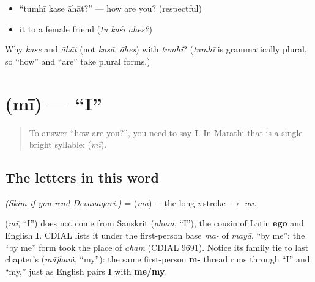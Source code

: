 \begin{itemize}
\raggedright
  \item \textquotedblleft{}tumhī kase āhāt?\textquotedblright{} — how are you? (respectful)
  \item it to a female friend (\emph{tū kaśī āhes?})
\end{itemize}

\begin{tcolorbox}[breakable,colback=teal!4,colframe=teal!35!black,title={Before you move on}]
Why \emph{kase} and \emph{āhāt} (not \emph{kasā}, \emph{āhes}) with \emph{tumhī}? (\emph{tumhī} is grammatically plural, so \textquotedblleft{}how\textquotedblright{} and \textquotedblleft{}are\textquotedblright{} take plural forms.)
\end{tcolorbox}
\section[\texorpdfstring{\mr{मी} (mī)}{मी (mī)}]{ (mī) — \textquotedblleft{}I\textquotedblright{}}

\label{lesson:MR-C03-mi}



\begin{quote}
To answer \textquotedblleft{}how are you?\textquotedblright{}, you need to say \textbf{I}. In Marathi that is a single bright syllable: \textbf{} (\emph{mī}).
\end{quote}

\subsection*{The letters in this word}
\emph{(Skim if you read Devanagari.)} \textbf{} = \textbf{} (\emph{ma}) + the long-\emph{ī} stroke \textbf{} $\to$ \emph{mī}.

\begin{cousinweb}
\textbf{} (\emph{mī}, \textquotedblleft{}I\textquotedblright{}) does not come from Sanskrit \textbf{} (\emph{aham}, \textquotedblleft{}I\textquotedblright{}), the cousin of Latin \textbf{ego} and English \textbf{I}. CDIAL lists it under the first-person base \emph{ma-} of \emph{mayā}, \textquotedblleft{}by me\textquotedblright{}: the \textquotedblleft{}by me\textquotedblright{} form took the place of \emph{aham} (CDIAL 9691). Notice its family tie to last chapter's \textbf{} (\emph{mājhaṁ}, \textquotedblleft{}my\textquotedblright{}): the same first-person \textbf{m-} thread runs through \textquotedblleft{}I\textquotedblright{} and \textquotedblleft{}my,\textquotedblright{} just as English pairs \textbf{I} with \textbf{me/my}.
\end{cousinweb}

